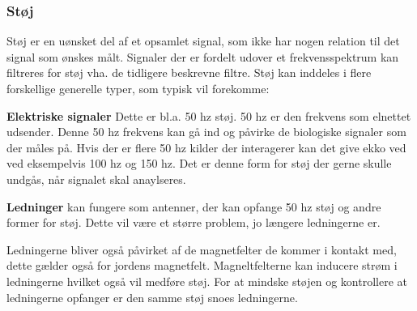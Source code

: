 \subsubsection{Støj}
Støj er en uønsket del af et opsamlet signal, som ikke har nogen relation til det signal som ønskes målt. Signaler der er fordelt udover et frekvensspektrum kan filtreres for støj vha. de tidligere beskrevne filtre. \cite{Devasahayam2000}
Støj kan inddeles i flere forskellige generelle typer, som typisk vil forekomme:

\textbf{Elektriske signaler} Dette er bl.a. 50 hz støj. 50 hz er den frekvens som elnettet udsender. Denne 50 hz frekvens kan gå ind og påvirke de biologiske signaler som der måles på. Hvis der er flere 50 hz kilder der interagerer kan det give ekko ved ved eksempelvis 100 hz og 150 hz. Det er denne form for støj der gerne skulle undgås, når signalet skal anaylseres.

\textbf{Ledninger} kan fungere som antenner, der kan opfange 50 hz støj og andre former for støj. Dette vil være et større problem, jo længere ledningerne er. 

Ledningerne bliver også påvirket af de magnetfelter de kommer i kontakt med, dette gælder også for jordens magnetfelt. Magneltfelterne kan inducere strøm i ledningerne hvilket også vil medføre støj. For at mindske støjen og kontrollere at ledningerne opfanger er den samme støj snoes ledningerne. 


 

% 
 
